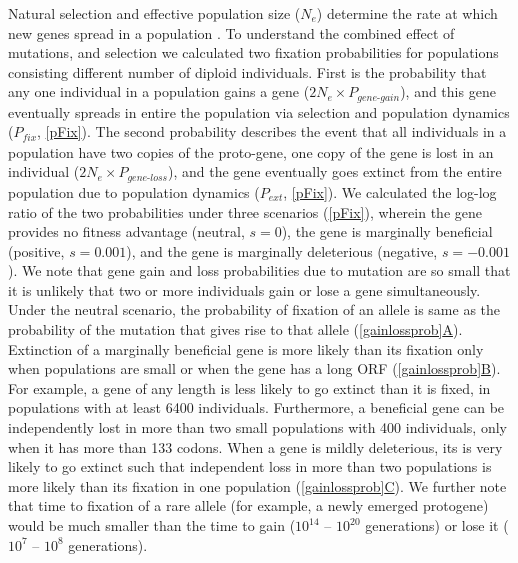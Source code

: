 \documentclass[12pt,a4paper]{article}
\newcommand{\cmnt}[1]{{\color{purple} #1}}
\begin{document}
\cmnt{Natural selection and effective population size ($N_e$) determine the rate at which new genes spread in a population \citep{KimuraFix}. To understand the combined effect of mutations, and selection we calculated two fixation probabilities for populations consisting different number of diploid individuals. First is the probability that any one individual in a population gains a gene ($2N_e \times P_\textit{gene-gain}$), and this gene eventually spreads in entire the population via selection and population dynamics ($P_\textit{fix}$, \autoref{pFix}). The second probability describes the event that all individuals in a population have two copies of the proto-gene, one copy of the gene is lost in an individual ($2N_e \times P_\textit{gene-loss}$), and the gene eventually goes extinct from the entire population due to population dynamics ($P_\textit{ext}$, \autoref{pFix}). We calculated the log-log ratio of the two probabilities under three scenarios (\autoref{pFix}), wherein the gene provides no fitness advantage (neutral, $s=0$), the gene is marginally beneficial (positive, $s = 0.001$), and the gene is marginally deleterious (negative, $s = -0.001$). We note that gene gain and loss probabilities due to mutation are so small that it is unlikely that two or more individuals gain or lose a gene simultaneously. Under the neutral scenario, the probability of fixation of an allele is same as the probability of the mutation that gives rise to that allele (\hyperref[gainlossprob]{\autoref{gainlossprob}A}). Extinction of a marginally beneficial gene is more likely than its fixation only when populations are small or when the gene has a long ORF (\hyperref[gainlossprob]{\autoref{gainlossprob}B}). For example, a gene of any length is less likely to go extinct than it is fixed, in populations with at least 6400 individuals. Furthermore, a beneficial gene can be independently lost in more than two small populations with 400 individuals, only when it has more than 133 codons. When a gene is mildly deleterious, its is very likely to go extinct such that independent loss in more than two populations is more likely than its fixation in one population (\hyperref[gainlossprob]{\autoref{gainlossprob}C}). We further note that time to fixation of a rare allele (for example, a newly emerged protogene) would be much smaller \citep[$4N_e$ generations;][]{KimuraFix} than the time to gain ($10^{14}$ -- $10^{20}$ generations) or lose it ($10^{7}$ -- $10^{8}$ generations).}
\end{document}
